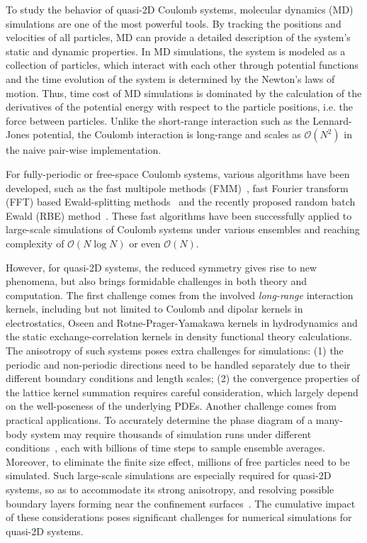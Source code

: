 To study the behavior of quasi-2D Coulomb systems, molecular dynamics (MD) simulations are one of the most powerful tools.
By tracking the positions and velocities of all particles, MD can provide a detailed description of the system's static and dynamic properties.
In MD simulations, the system is modeled as a collection of particles, which interact with each other through potential functions and the time evolution of the system is determined by the Newton's laws of motion.
Thus, time cost of MD simulations is dominated by the calculation of the derivatives of the potential energy with respect to the particle positions, i.e. the force between particles.
Unlike the short-range interaction such as the Lennard-Jones potential, the Coulomb interaction is long-range and scales as $\mathcal O(N^2)$ in the naive pair-wise implementation.


For fully-periodic or free-space Coulomb systems, various algorithms have been developed, such as the fast multipole methods (FMM)~\cite{greengard1987fast,cheng1999fast,ying2004kernel}, fast Fourier transform (FFT) based Ewald-splitting methods~\cite{hockney2021computer,darden1993particle,essmann1995smooth} and the recently proposed random batch Ewald (RBE) method~\cite{jin2021random, liang2022superscalability,liang2024JCP}.
These fast algorithms have been successfully applied to large-scale simulations of Coulomb systems under various ensembles and reaching complexity of $\mathcal O(N\log N)$ or even $\mathcal O(N)$.


However, for quasi-2D systems, the reduced symmetry gives rise to new phenomena, but also brings formidable challenges in both theory and computation.
The first challenge comes from the involved \emph{long-range} interaction kernels, including but not limited to Coulomb and dipolar kernels in electrostatics, Oseen and Rotne-Prager-Yamakawa kernels in hydrodynamics and the static exchange-correlation kernels in density functional theory calculations. 
The anisotropy of such systems poses extra challenges for simulations:
(1) the periodic and non-periodic directions need to be handled separately due to their different boundary conditions and length scales;
(2) the convergence properties of the lattice kernel summation requires careful consideration, which largely depend on the well-poseness of the underlying PDEs. 
Another challenge comes from practical applications.
To accurately determine the phase diagram of a many-body system may require thousands of simulation runs under different conditions~\cite{levin2002electrostatic}, each with billions of time steps to sample ensemble averages.
Moreover, to eliminate the finite size effect, millions of free particles need to be simulated. Such large-scale simulations are especially required for quasi-2D systems, so as to accommodate its strong anisotropy, and resolving possible boundary layers forming near the confinement surfaces~\cite{mazars2011long}. 
The cumulative impact of these considerations poses significant challenges for numerical simulations for quasi-2D systems. 

